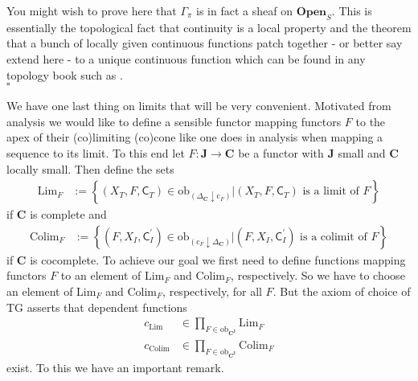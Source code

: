 \begin{prf}
You might wish to prove here that $\Gamma_{\pi}$ is in fact a sheaf on $\mathbf{Open}_{S}$. This is essentially the topological fact that continuity is a local property and the theorem that a bunch of locally given continuous functions patch together - or better say extend here - to a unique continuous function which can be found in any topology book such as \cite{273ba834}.
\\
\phantom{proven}
\hfill
$\square$
\end{prf}
We have one last thing on limits that will be very convenient. Motivated from analysis we would like to define a sensible functor mapping functors $F$ to the apex of their (co)limiting (co)cone like one does in analysis when mapping a sequence to its limit. To this end let $F \colon \mathbf{J} \rightarrow \mathbf{C}$ be a functor with $\mathbf{J}$ small and $\mathbf{C}$ locally small. Then define the sets
\begin{align*}
  \mathrm{Lim}_{F}
  &:=
  \left\lbrace
      (X_{T},F,\mathsf{C}_{T})
      \in
      \mathrm{ob}_{(\Delta_{\mathbf{C}} \downarrow \mathrm{c}_{F})}
    \vert
      (X_{T},F,\mathsf{C}_{T})
      \text{ is a limit of }
      F
  \right\rbrace
\end{align*}
if $\mathbf{C}$ is complete and
\begin{align*}
  \mathrm{Colim}_{F}
  &:=
  \left\lbrace
      (F,X_{I},\mathsf{C}_{I}^{\prime})
      \in
      \mathrm{ob}_{(\mathrm{c}_{F} \downarrow \Delta_{\mathbf{C}})}
    \vert
      (F,X_{I},\mathsf{C}_{I}^{\prime})
      \text{ is a colimit of }
      F
  \right\rbrace
\end{align*}
if $\mathbf{C}$ is cocomplete. To achieve our goal we first need to define functions mapping functors $F$ to an element of $\mathrm{Lim}_{F}$ and $\mathrm{Colim}_{F}$, respectively. So we have to choose an element of $\mathrm{Lim}_{F}$ and $\mathrm{Colim}_{F}$, respectively, for all $F$. But the axiom of choice of TG asserts that dependent functions
\begin{align*}
  c_{\mathrm{Lim}}
  &\in
  \prod_{F \in \mathrm{ob}_{\mathbf{C}^{\mathbf{J}}}}
  \mathrm{Lim}_{F}
  \\
  c_{\mathrm{Colim}}
  &\in
  \prod_{F \in \mathrm{ob}_{\mathbf{C}^{\mathbf{J}}}}
  \mathrm{Colim}_{F}
\end{align*}
exist. To this we have an important remark.
\\
